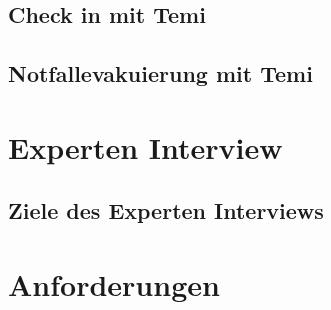 \subsection{Check in mit Temi}
\subsection{Notfallevakuierung mit Temi}
\section{Experten Interview}
\subsection{Ziele des Experten Interviews}
\section{Anforderungen}
